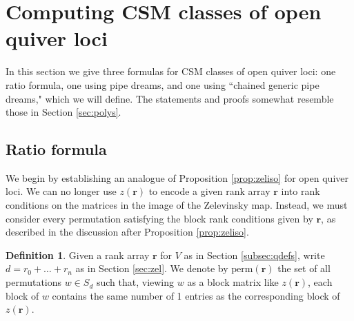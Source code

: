 \documentclass[reqno]{amsart}
\newcommand{\perm}{\textrm{perm}}
\numberwithin{equation}{section}
\theoremstyle{definition}
\newtheorem{definition}[theorem]{Definition}
\theoremstyle{remark}
\begin{document}
\section{Computing CSM classes of open quiver loci}\label{sec:opencsm}
In this section we give three formulas for CSM classes of open quiver loci: one ratio formula, one using pipe dreams, and one using ``chained generic pipe dreams," which we will define. The statements and proofs somewhat resemble those in Section \ref{sec:polys}.

\subsection{Ratio formula}
We begin by establishing an analogue of Proposition \ref{prop:zeliso} for open quiver loci. We can no longer use $z(\mathbf{r})$ to encode a given rank array $\mathbf{r}$ into rank conditions on the matrices in the image of the Zelevinsky map. Instead, we must consider every permutation satisfying the block rank conditions given by $\mathbf{r}$, as described in the discussion after Proposition \ref{prop:zeliso}. 
\begin{definition}
Given a rank array $\mathbf{r}$ for $V$ as in Section \ref{subsec:qdefs}, write $d=r_0+\dots+r_n$ as in Section \ref{sec:zel}. We denote by $\perm(\mathbf{r})$ the set of all
permutations $w \in S_d$
such that, viewing $w$ as a block matrix like $z(\mathbf{r})$, each block of $w$ contains the same number of 1 entries as the corresponding block of $z(\mathbf{r})$.
\end{definition}
\end{document}
